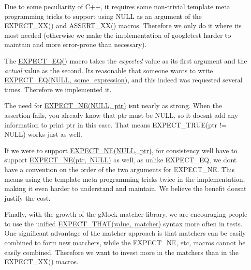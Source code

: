 Due to some peculiarity of C++, it requires some non-\/trivial template meta programming tricks to support using {\ttfamily N\+U\+LL} as an argument of the {\ttfamily E\+X\+P\+E\+C\+T\+\_\+\+X\+X()} and {\ttfamily A\+S\+S\+E\+R\+T\+\_\+\+X\+X()} macros. Therefore we only do it where it\textquotesingle{}s most needed (otherwise we make the implementation of googletest harder to maintain and more error-\/prone than necessary).

The {\ttfamily \mbox{\hyperlink{gtest_8h_a4159019abda84f5366acdb7604ff220a}{E\+X\+P\+E\+C\+T\+\_\+\+E\+Q()}}} macro takes the {\itshape expected} value as its first argument and the {\itshape actual} value as the second. It\textquotesingle{}s reasonable that someone wants to write {\ttfamily \mbox{\hyperlink{gtest_8h_a4159019abda84f5366acdb7604ff220a}{E\+X\+P\+E\+C\+T\+\_\+\+E\+Q(\+N\+U\+L\+L, some\+\_\+expression)}}}, and this indeed was requested several times. Therefore we implemented it.

The need for {\ttfamily \mbox{\hyperlink{gtest_8h_a6ae7443947f25abc58bfcfcfc56b0d75}{E\+X\+P\+E\+C\+T\+\_\+\+N\+E(\+N\+U\+L\+L, ptr)}}} isn\textquotesingle{}t nearly as strong. When the assertion fails, you already know that {\ttfamily ptr} must be {\ttfamily N\+U\+LL}, so it doesn\textquotesingle{}t add any information to print {\ttfamily ptr} in this case. That means {\ttfamily E\+X\+P\+E\+C\+T\+\_\+\+T\+R\+UE(ptr != N\+U\+LL)} works just as well.

If we were to support {\ttfamily \mbox{\hyperlink{gtest_8h_a6ae7443947f25abc58bfcfcfc56b0d75}{E\+X\+P\+E\+C\+T\+\_\+\+N\+E(\+N\+U\+L\+L, ptr)}}}, for consistency we\textquotesingle{}ll have to support {\ttfamily \mbox{\hyperlink{gtest_8h_a6ae7443947f25abc58bfcfcfc56b0d75}{E\+X\+P\+E\+C\+T\+\_\+\+N\+E(ptr, N\+U\+L\+L)}}} as well, as unlike {\ttfamily E\+X\+P\+E\+C\+T\+\_\+\+EQ}, we don\textquotesingle{}t have a convention on the order of the two arguments for {\ttfamily E\+X\+P\+E\+C\+T\+\_\+\+NE}. This means using the template meta programming tricks twice in the implementation, making it even harder to understand and maintain. We believe the benefit doesn\textquotesingle{}t justify the cost.

Finally, with the growth of the g\+Mock matcher library, we are encouraging people to use the unified {\ttfamily \mbox{\hyperlink{gmock-matchers_8h_ac31e206123aa702e1152bb2735b31409}{E\+X\+P\+E\+C\+T\+\_\+\+T\+H\+A\+T(value, matcher)}}} syntax more often in tests. One significant advantage of the matcher approach is that matchers can be easily combined to form new matchers, while the {\ttfamily E\+X\+P\+E\+C\+T\+\_\+\+NE}, etc, macros cannot be easily combined. Therefore we want to invest more in the matchers than in the {\ttfamily E\+X\+P\+E\+C\+T\+\_\+\+X\+X()} macros.

